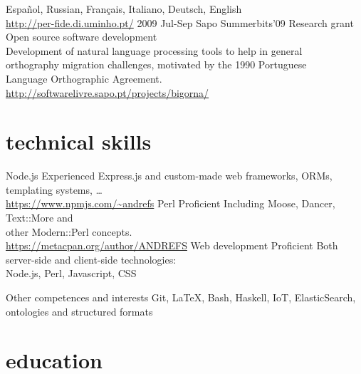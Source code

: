 \documentclass[a4paper]{friggeri-cv}
\begin{document}
\begin{entrylist}
{    Español, Russian, Français, Italiano, Deutsch, English\\
    {\footnotesize
    \url{http://per-fide.di.uminho.pt/}
    }}
  \entry
    {2009 {\footnotesize Jul-Sep}}
    {Sapo Summerbits'09}
    {Research grant}
    {Open source software development\\
    \footnotesize{
    Development of natural language processing tools to help in general\\
    orthography migration challenges, motivated by the 1990 Portuguese\\
    Language Orthographic Agreement.\\
    \url{http://softwarelivre.sapo.pt/projects/bigorna/}}}
\end{entrylist}


\section{technical skills}
\begin{entrylist}
    \entry
        {}
        {Node.js}
        {Experienced}
        {Express.js and custom-made web frameworks, ORMs,\\ templating systems, \dots\\
        \footnotesize{\url{https://www.npmjs.com/~andrefs}}}
    \entry
        {}
        {Perl}
        {Proficient}
        {Including Moose, Dancer, Text::More and\\
        other Modern::Perl concepts.\\
        \footnotesize{\url{https://metacpan.org/author/ANDREFS}}}
    \entry
        {}
        {Web development}
        {Proficient}
        {Both server-side and client-side technologies:\\
        Node.js, Perl, Javascript, CSS}
\end{entrylist}
\begin{entrylist}
    \entry
        {}
        {Other competences and interests}
        {}
        {Git, \LaTeX, Bash, Haskell, IoT, ElasticSearch, ontologies and structured formats}
\end{entrylist}

\newpage
\section{education}
\end{document}
